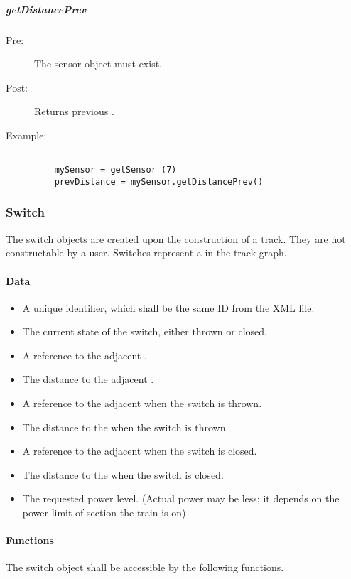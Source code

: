 \documentclass[a4paper,11pt,notitlepage]{article}
\begin{document}
\subparagraph{getDistancePrev}
\begin{description}
\item[\hspace{1cm}Pre:] The sensor object must exist.
\item[\hspace{1cm}Post:] Returns previous \TN.
\item[\hspace{1cm}Example:]
\begin{verbatim}

    mySensor = getSensor (7)
    prevDistance = mySensor.getDistancePrev()
\end{verbatim}
\end{description}


\subsubsection{Switch}
The switch objects are created upon the construction of a track. They are not constructable by a user. Switches represent a \TN in the track graph.
\paragraph{Data}
\begin{itemize}
\item A unique identifier, which shall be the same ID from the XML file.
\item The current state of the switch, either thrown or closed.
\item A reference to the adjacent \TN.
\item The distance to the adjacent \TN.
\item A reference to the adjacent \TN when the switch is thrown.
\item The distance to the \TN when the switch is thrown.
\item A reference to the adjacent \TN when the switch is closed.
\item The distance to the \TN when the switch is closed.
\item The requested power level. (Actual power may be less; it depends on the power limit of section the train is on)
\end{itemize}
\paragraph{Functions}
The switch object shall be accessible by the following functions.
\end{document}
